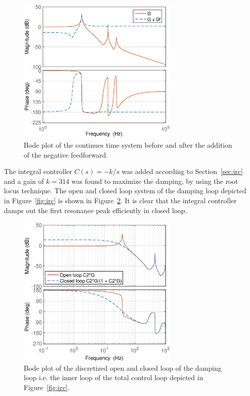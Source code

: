 \begin{figure}[h!]
  \centering
  \includegraphics[width=0.7\textwidth]{fig/matlab/bodeafterfeedf.eps}
  \caption{\label{fig:bodeafterfeedf} Bode plot of the continues time system before and after the addition of the negative feedforward.}
\end{figure}

The integral controller $C(s)=-k/s$ was added according to Section~\ref{sec:irc} and a gain of $k=314$ was found to maximize the damping, by using the root locus technique.
The open and closed loop system of the \abbrIRC damping loop depicted in Figure~\ref{fig:irc} is shown in Figure~\ref{fig:bodedamped}. It is clear that the integral controller damps out the first resonance peak efficiently in closed loop.

\begin{figure}[h!]
  \centering
  \includegraphics[width=0.7\textwidth]{fig/matlab/bodedamped2}
  \caption{\label{fig:bodedamped} Bode plot of the discretized open and closed loop of the \abbrIRC damping loop i.e. the inner loop of the total control loop depicted in Figure~\ref{fig:irc}.}
\end{figure}

